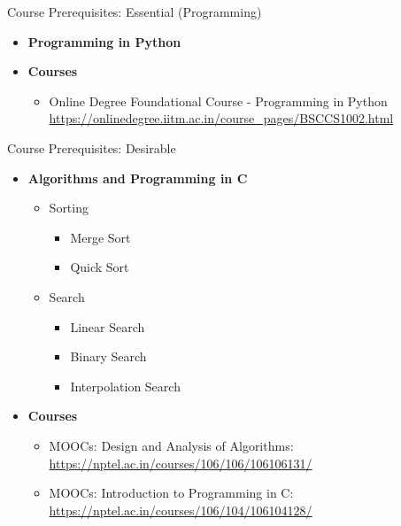 \documentclass[aspectratio=169, xcolor=dvipsnames]{beamer}
\begin{document}
\begin{frame}{Course Prerequisites: Essential (Programming)}
    \begin{itemize}[<+->]
        \item \textbf{Programming in Python}
        \item \textbf{Courses}
        \begin{itemize}
            \item[$\triangleright$] Online Degree Foundational Course - Programming in Python \\
            \url{https://onlinedegree.iitm.ac.in/course_pages/BSCCS1002.html}
        \end{itemize}
    \end{itemize}
\end{frame}

\begin{frame}{Course Prerequisites: Desirable}
    \begin{itemize}[<+->]
        \item \textbf{Algorithms and Programming in C}
        \begin{itemize}
            \item Sorting
            \begin{itemize}
                \item[$\triangleright$] Merge Sort
                \item[$\triangleright$] Quick Sort
            \end{itemize}
            \item Search
            \begin{itemize}
                \item[$\triangleright$] Linear Search
                \item[$\triangleright$] Binary Search
                \item[$\triangleright$] Interpolation Search
            \end{itemize}
        \end{itemize}
        \item \textbf{Courses}
        \begin{itemize}
            \item[$\triangleright$] MOOCs: Design and Analysis of Algorithms: \\
            \url{https://nptel.ac.in/courses/106/106/106106131/}
            \item[$\triangleright$] MOOCs: Introduction to Programming in C: \\
            \url{https://nptel.ac.in/courses/106/104/106104128/}
        \end{itemize}
    \end{itemize}
\end{frame}
\end{document}

